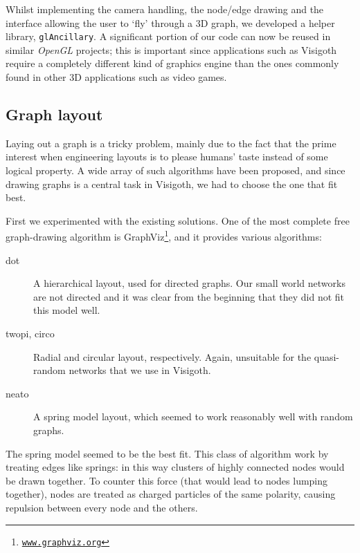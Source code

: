 \documentclass[a4paper,11pt,titlepage]{article}
\let\stdhref\href
\renewcommand{\href}[2]{\stdhref{#1}{\texttt{#2}}}
\newcommand{\code}[1]{\texttt{#1}}
\newcommand{\buzz}[1]{\emph{#1}}
\newcommand{\myhref}[1]{\href{http://#1}{#1}}
\newcommand{\OpenGL}{\buzz{OpenGL} }
\begin{document}
Whilst implementing the camera handling, the node/edge drawing and the
interface allowing the user to `fly' through a 3D graph, we developed
a helper library, \code{glAncillary}. A significant portion of our
code can now be reused in similar \OpenGL projects; this is important
since applications such as Visigoth require a completely different
kind of graphics engine than the ones commonly found in other 3D
applications such as video games.



\subsection{Graph layout}
Laying out a graph is a tricky problem, mainly due to the fact that the
prime interest when engineering layouts is to please humans' taste
instead of some logical property. A wide array of such algorithms have
been proposed, and since drawing graphs is a central task in Visigoth,
we had to choose the one that fit best.

First we experimented with the existing solutions. One of the most
complete free graph-drawing algorithm is
GraphViz\footnote{\myhref{www.graphviz.org}},
and it provides various algorithms:

\begin{description}
\item [dot] A hierarchical layout, used for directed graphs. Our small
  world networks are not directed and it was clear from the beginning
  that they did not fit this model well.

\item [twopi, circo] Radial and circular layout, respectively. Again,
  unsuitable for the quasi-random networks that we use in Visigoth.

\item [neato] A spring model layout, which seemed to work reasonably
  well with random graphs.
\end{description}

The spring model seemed to be the best fit. This class of algorithm
work by treating edges like springs: in this way clusters of highly
connected nodes would be drawn together. To counter this force (that
would lead to nodes lumping together), nodes are treated as charged
particles of the same polarity, causing repulsion between every node
and the others.
\end{document}

